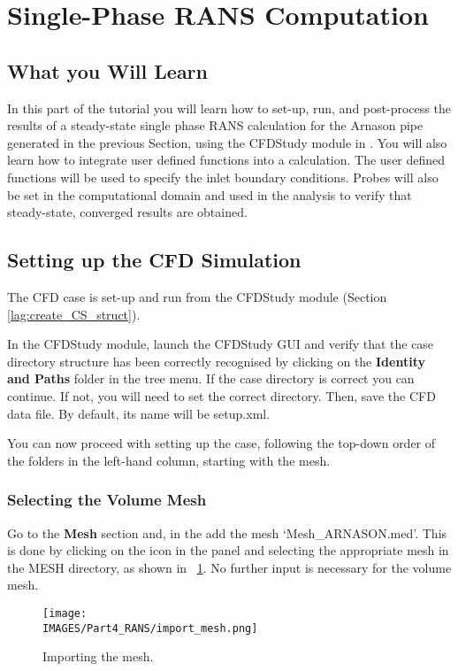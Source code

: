\section{Single-Phase RANS Computation}
%
\subsection{What you Will Learn}
%
In this part of the tutorial you will learn how to set-up, run, and post-process the results of a steady-state single phase RANS calculation for the Arnason pipe generated in the previous Section, using the CFDStudy module in \salome. You will also learn how to integrate user defined functions into a \CS calculation. The user defined functions will be used to specify the inlet boundary conditions. Probes will also be set in the computational domain and used in the analysis to verify that steady-state, converged results are obtained.
%
\subsection{Setting up the CFD Simulation}
%
The CFD case is set-up and run from the CFDStudy module (Section \ref{lag:create_CS_struct}). 

In the CFDStudy module, launch the CFDStudy GUI and verify that the case directory structure has been correctly recognised by clicking on the \textbf{Identity and Paths} folder in the tree menu.  If the case directory is correct you can continue.  If not, you will need to set the correct directory.  Then, save the CFD data file. By default, its name will be setup.xml.

You can now proceed with setting up the case, following the top-down order of the folders in the left-hand column, starting with the mesh.

\subsubsection{Selecting the Volume Mesh}

Go to the {\color{eblue} \bf Mesh} section  and, in the  add the mesh ‘Mesh\_ARNASON.med’. This is done by clicking on the \keys{$+$} icon in the panel and selecting the appropriate mesh in the MESH directory, as shown in \figurename~\ref{lag:import_mesh}.  No further input is necessary for the volume mesh.
%
\begin{figure}[H]
\centering
\texttt{[image: \\IMAGES/Part4\_RANS/import\_mesh.png]}
\caption{Importing the mesh.}\label{lag:import_mesh}
\end{figure}
%

